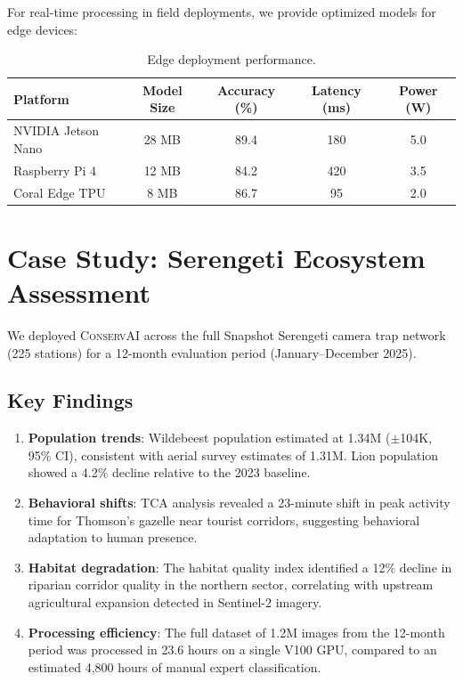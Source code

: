 \documentclass[11pt,letterpaper]{article}
\newcommand{\ConservAI}{\textsc{ConservAI}}
\begin{document}
For real-time processing in field deployments, we provide optimized models for edge devices:

\begin{table}[htbp]
\centering
\caption{Edge deployment performance.}
\label{tab:edge}
\begin{tabular}{lcccc}
\toprule
\textbf{Platform} & \textbf{Model Size} & \textbf{Accuracy (\%)} & \textbf{Latency (ms)} & \textbf{Power (W)} \\
\midrule
NVIDIA Jetson Nano & 28 MB & 89.4 & 180 & 5.0 \\
Raspberry Pi 4 & 12 MB & 84.2 & 420 & 3.5 \\
Coral Edge TPU & 8 MB & 86.7 & 95 & 2.0 \\
\bottomrule
\end{tabular}
\end{table}

\section{Case Study: Serengeti Ecosystem Assessment}

We deployed \ConservAI{} across the full Snapshot Serengeti camera trap network (225 stations) for a 12-month evaluation period (January--December 2025).

\subsection{Key Findings}

\begin{enumerate}[leftmargin=*]
    \item \textbf{Population trends}: Wildebeest population estimated at 1.34M ($\pm$104K, 95\% CI), consistent with aerial survey estimates of 1.31M. Lion population showed a 4.2\% decline relative to the 2023 baseline.
    \item \textbf{Behavioral shifts}: TCA analysis revealed a 23-minute shift in peak activity time for Thomson's gazelle near tourist corridors, suggesting behavioral adaptation to human presence.
    \item \textbf{Habitat degradation}: The habitat quality index identified a 12\% decline in riparian corridor quality in the northern sector, correlating with upstream agricultural expansion detected in Sentinel-2 imagery.
    \item \textbf{Processing efficiency}: The full dataset of 1.2M images from the 12-month period was processed in 23.6 hours on a single V100 GPU, compared to an estimated 4,800 hours of manual expert classification.
\end{enumerate}
\end{document}
